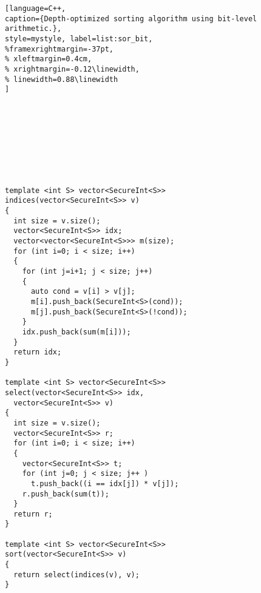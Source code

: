 \begin{figure}[t]
\begin{minipage}{\linewidth}
\begin{lstlisting}[language=C++,
caption={Depth-optimized sorting algorithm using bit-level arithmetic.},
style=mystyle, label=list:sor_bit,
%framexrightmargin=-37pt,
% xleftmargin=0.4cm,
% xrightmargin=-0.12\linewidth,
% linewidth=0.88\linewidth
]









template <int S> vector<SecureInt<S>>
indices(vector<SecureInt<S>> v)
{
  int size = v.size();
  vector<SecureInt<S>> idx;
  vector<vector<SecureInt<S>>> m(size);
  for (int i=0; i < size; i++)
  {
    for (int j=i+1; j < size; j++)
    {
      auto cond = v[i] > v[j];
      m[i].push_back(SecureInt<S>(cond));
      m[j].push_back(SecureInt<S>(!cond));
    }
    idx.push_back(sum(m[i]));
  }
  return idx;
}

template <int S> vector<SecureInt<S>>
select(vector<SecureInt<S>> idx,
  vector<SecureInt<S>> v)
{
  int size = v.size();
  vector<SecureInt<S>> r;
  for (int i=0; i < size; i++)
  {
    vector<SecureInt<S>> t;
    for (int j=0; j < size; j++ )
      t.push_back((i == idx[j]) * v[j]);
    r.push_back(sum(t));
  }
  return r;
}

template <int S> vector<SecureInt<S>>
sort(vector<SecureInt<S>> v)
{
  return select(indices(v), v);
}

\end{lstlisting}
\end{minipage}
\end{figure}
